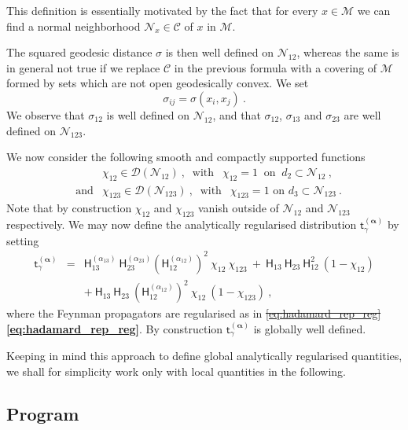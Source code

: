 \documentclass[11pt]{book}
\newcommand{\com}[1]{{\color{red}\bf #1}}
\newcommand{\sbar}[1]{\sout{\color{red} #1}}
\newcommand{\alphabd}{\boldsymbol{\alpha}}
\newcommand{\Ccal}{\mathcal{C}}
\newcommand{\Dcal}{\mathcal{D}}
\newcommand{\Mcal}{\mathcal{M}}
\newcommand{\Ncal}{\mathcal{N}}
\newcommand{\Hsf}{\mathsf{H}}
\newcommand{\tsf}{\mathsf{t}}
\theoremstyle{break}
\begin{document}
This definition is essentially motivated by the fact that for every $x \in \Mcal$ we can find a normal neighborhood $\Ncal_x \in \Ccal$ of $x$ in $\Mcal$. 



The squared geodesic distance $\sigma$ is then well defined on $\mathcal{N}_{12}$, whereas the same is in general not true if we replace $\mathcal{C}$ in the previous formula with a covering of $\mathcal{M}$ formed by sets which are not open geodesically convex. We set 
%
\begin{equation*}
\sigma_{ij} = \sigma(x_i,x_j) \ .
\end{equation*}
%
We observe that $\sigma_{12}$ is well defined on $\Ncal_{12}$, and that $\sigma_{12}$, $\sigma_{13}$ and $\sigma_{23}$ are well defined on $\Ncal_{123}$. 


We now consider the following smooth and compactly supported functions
%
\begin{eqnarray*}
&& \chi_{12} \in \Dcal(\Ncal_{12}) \ , \ \mbox{ with } \ \ \chi_{12} = 1 \ \mbox{ on } \ d_2 \subset \Ncal_{12} \ , \\[6pt]
&\mbox{and}& \chi_{123} \in \Dcal(\Ncal_{123}) \ , \ \mbox{ with } \ \ \chi_{123} = 1 \mbox{ on } d_3 \subset \Ncal_{123} \ . 
\end{eqnarray*}
%
Note that by construction $\chi_{12}$ and $\chi_{123}$ vanish outside of $\Ncal_{12}$ and $\Ncal_{123}$ respectively. We may now define the analytically regularised distribution $\tsf^{(\alphabd)}_\gamma$ by setting
%
\begin{eqnarray}
\tsf^{(\alphabd)}_\gamma &=& \Hsf^{(\alpha_{13})}_{13} \ \Hsf^{(\alpha_{23})}_{23} \left(\Hsf^{(\alpha_{12})}_{12}\right)^2 \ \chi_{12} \ \chi_{123} \ + \ \Hsf_{13} \ \Hsf_{23} \ \Hsf_{12}^2 \ (1-\chi_{12}) \nonumber \\[3pt]
&& + \ \Hsf_{13} \ \Hsf_{23} \ \left(\Hsf^{(\alpha_{12})}_{12}\right)^2 \ \chi_{12} \ (1-\chi_{123}) \ , 
\label{eq:kernel_reg_glob}
\end{eqnarray}
%
where the Feynman propagators are regularised as in \sbar{\ref{eq:hadamard_rep_reg}} \com{\eqref{eq:hadamard_rep_reg}}. By construction $\tsf^{(\alphabd)}_\gamma$ is globally well defined.


Keeping in mind this approach to define global analytically regularised quantities, we shall for simplicity work only with local quantities in the following.


\subsection{Program} 
\label{p:PROGRAM}
\end{document}
